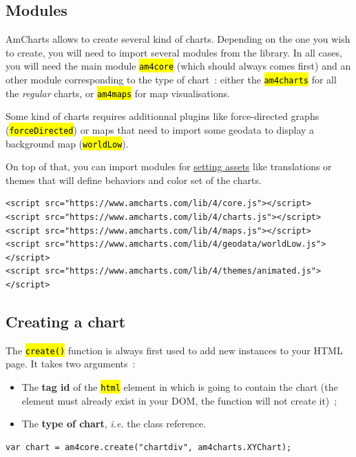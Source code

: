 \documentclass[a4paper,12pt,twoside]{book}
\let\OldTexttt\texttt
\renewcommand{\texttt}[1]{\OldTexttt{\hl{#1}}}
\begin{document}
			\subsection{Modules}\label{modules}

AmCharts allows to create several kind of charts. Depending on the one you wish to create, you will need to import several modules from the library. In all cases, you will need the main module \texttt{am4core} (which should always comes first) and an other module corresponding to the type of chart~: either the \texttt{am4charts} for all the \emph{regular} charts, or \texttt{am4maps} for map visualisations.

Some kind of charts requires additionnal plugins like force-directed graphs (\texttt{forceDirected}) or maps that need to import some geodata to display a background map (\texttt{worldLow}).

On top of that, you can import modules for \href{https://www.amcharts.com/docs/v4/getting-started/using-javascript/\#Assets}{setting assets} like translations or themes that will define behaviors and color set of the charts.

\begin{lstlisting}
<script src="https://www.amcharts.com/lib/4/core.js"></script>
<script src="https://www.amcharts.com/lib/4/charts.js"></script>
<script src="https://www.amcharts.com/lib/4/maps.js"></script>
<script src="https://www.amcharts.com/lib/4/geodata/worldLow.js"></script>
<script src="https://www.amcharts.com/lib/4/themes/animated.js"></script>
\end{lstlisting}

			\subsection{Creating a chart}\label{creating-a-chart}

The \texttt{create()} function is always first used to add new instances to your HTML page. It takes two arguments~:

\begin{itemize}
	\item The \textbf{tag id} of the \texttt{html} element in which is going to contain the chart (the element must already exist in your DOM, the function will not create it)~;
	\item The \textbf{type of chart}, \emph{i.e.} the class reference.
\end{itemize}

\begin{lstlisting}
var chart = am4core.create("chartdiv", am4charts.XYChart);
\end{lstlisting}
\end{document}
